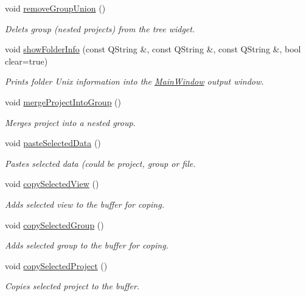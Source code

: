 \begin{DoxyCompactItemize}
void \hyperlink{classMainWindow_a1829103fc2661a8c1f0a2c2a730da53a}{remove\-Group\-Union} ()
\begin{DoxyCompactList}\small\item\em Delets group (nested projects) from the tree widget. \end{DoxyCompactList}\item 
void \hyperlink{classMainWindow_a38f2a589547d744fe8effcd86d56522f}{show\-Folder\-Info} (const Q\-String \&, const Q\-String \&, const Q\-String \&, bool clear=true)
\begin{DoxyCompactList}\small\item\em Prints folder Unix information into the \hyperlink{classMainWindow}{Main\-Window} output window. \end{DoxyCompactList}\item 
void \hyperlink{classMainWindow_aedcf4e7322932599339fd7213751e653}{merge\-Project\-Into\-Group} ()
\begin{DoxyCompactList}\small\item\em Merges project into a nested group. \end{DoxyCompactList}\item 
void \hyperlink{classMainWindow_a003d3ff529129c1613cabc25dcbb3450}{paste\-Selected\-Data} ()
\begin{DoxyCompactList}\small\item\em Pastes selected data (could be project, group or file. \end{DoxyCompactList}\item 
void \hyperlink{classMainWindow_a6da44654044153535dabe1cfd21714be}{copy\-Selected\-View} ()
\begin{DoxyCompactList}\small\item\em Adds selected view to the buffer for coping. \end{DoxyCompactList}\item 
void \hyperlink{classMainWindow_a0eb4ce1b63db072df36b119b0488d8ce}{copy\-Selected\-Group} ()
\begin{DoxyCompactList}\small\item\em Adds selected group to the buffer for coping. \end{DoxyCompactList}\item 
void \hyperlink{classMainWindow_a519a38c202ac69dbc0c2e5d0ae971768}{copy\-Selected\-Project} ()
\begin{DoxyCompactList}\small\item\em Copies selected project to the buffer. \end{DoxyCompactList}\item 

\end{DoxyCompactItemize}
